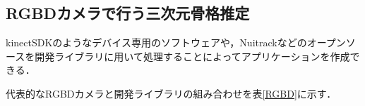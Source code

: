 \documentclass[titlepage]{jarticle}
\begin{document}
\subsection{RGBDカメラで行う三次元骨格推定}
kinectSDK\cite{kinectSDK}のようなデバイス専用のソフトウェアや，Nuitrack\cite{nuitrack}などのオープンソースを開発ライブラリに用いて処理することによってアプリケーションを作成できる．


代表的なRGBDカメラと開発ライブラリの組み合わせを表\ref{RGBD}に示す．




\end{document}
